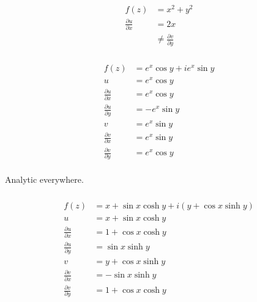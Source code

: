 \documentclass{article}
\begin{document}
\setcounter{subsubsection}{6}
\subsubsection{}

\begin{align*}
  f(z)                          & = x^2 + y^2                       \\
  \frac{\partial u}{\partial x} & = 2 x                             \\
                                & \ne \frac{\partial v}{\partial y}
\end{align*}

\setcounter{subsubsection}{8}
\subsubsection{}

\begin{align*}
  f(z)                          & = e^x \cos y + i e^x \sin y \\
  u                             & = e^x \cos y                \\
  \frac{\partial u}{\partial x} & = e^x \cos y                \\
  \frac{\partial u}{\partial y} & = -e^x \sin y               \\
  v                             & = e^x \sin y                \\
  \frac{\partial v}{\partial x} & = e^x \sin y                \\
  \frac{\partial v}{\partial y} & = e^x \cos y                \\
\end{align*}

Analytic everywhere.

\setcounter{subsubsection}{10}
\subsubsection{}

\begin{align*}
  f(z)                          & = x + \sin x \cosh y + i (y + \cos x \sinh y) \\
  u                             & = x + \sin x \cosh y                          \\
  \frac{\partial u}{\partial x} & = 1 + \cos x \cosh y                          \\
  \frac{\partial u}{\partial y} & = \sin x \sinh y                              \\
  v                             & = y + \cos x \sinh y                          \\
  \frac{\partial v}{\partial x} & = -\sin x \sinh y                             \\
  \frac{\partial v}{\partial y} & = 1 + \cos x \cosh y
\end{align*}
\end{document}

